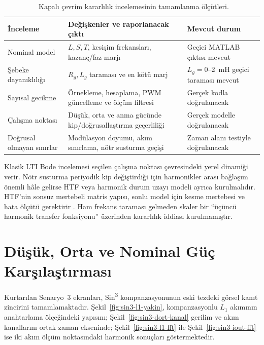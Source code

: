 \begin{table}[htbp]
  \centering
  \caption{\juriistegietiketi\ Kapalı çevrim kararlılık incelemesinin tamamlanma ölçütleri.}
  \label{tab:sin3-kararlilik-kontrol-listesi}
  \small
  \begin{tabularx}{\textwidth}{p{} X p{}}
    \toprule
    İnceleme & Değişkenler ve raporlanacak çıktı & Mevcut durum \\
    \midrule
    Nominal model & $L,S,T$, kesişim frekansları, kazanç/faz marjı & Geçici MATLAB çıktısı mevcut \\
    Şebeke dayanıklılığı & $R_g,L_g$ taraması ve en kötü marj & $L_g=0$--\SI{2}{\milli\henry} geçici taraması mevcut \\
    Sayısal gecikme & Örnekleme, hesaplama, PWM güncelleme ve ölçüm filtresi & Gerçek kodla doğrulanacak \\
    Çalışma noktası & Düşük, orta ve anma gücünde kip/doğrusallaştırma geçerliliği & Gerçek modelle doğrulanacak \\
    Doğrusal olmayan sınırlar & Modülasyon doyumu, akım sınırlama, nötr susturma geçişi & Zaman alanı testiyle doğrulanacak \\
    \bottomrule
  \end{tabularx}
\end{table}

Klasik LTI Bode incelemesi seçilen çalışma noktası çevresindeki yerel dinamiği verir. Nötr susturma periyodik kip değiştirdiği için harmonikler arası bağlaşım önemli hâle gelirse HTF veya harmonik durum uzayı modeli ayrıca kurulmalıdır. HTF'nin sonsuz mertebeli matris yapısı, sonlu model için kesme mertebesi ve hata ölçütü gerektirir \citep{Liao2022}. Ham frekans taraması gelmeden skaler bir ``üçüncü harmonik transfer fonksiyonu'' üzerinden kararlılık iddiası kurulmamıştır.

\section{Düşük, Orta ve Nominal Güç Karşılaştırması}

Kurtarılan Senaryo~3 ekranları, Sin\textsuperscript{3} kompanzasyonunun eski tezdeki görsel kanıt zincirini tamamlamaktadır. Şekil~\ref{fig:sin3-l1-yakin}, kompanzasyonlu $L_1$ akımının anahtarlama ölçeğindeki yapısını; Şekil~\ref{fig:sin3-dort-kanal} gerilim ve akım kanallarını ortak zaman ekseninde; Şekil~\ref{fig:sin3-l1-fft} ile Şekil~\ref{fig:sin3-iout-fft} ise iki akım ölçüm noktasındaki harmonik sonuçları göstermektedir.


